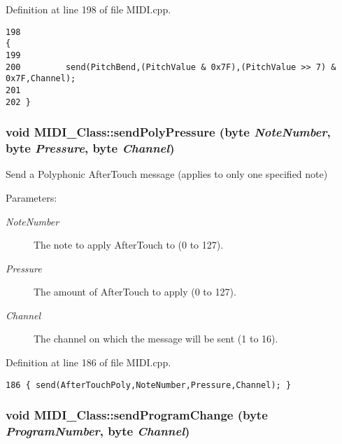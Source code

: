 Definition at line 198 of file MIDI.cpp.

\begin{Code}\begin{verbatim}198                                                                    {
199 
200         send(PitchBend,(PitchValue & 0x7F),(PitchValue >> 7) & 0x7F,Channel);
201         
202 }
\end{verbatim}
\end{Code}


\hypertarget{class_m_i_d_i___class_028ec5a49dccf9c28b00e11e7a3d1d05}{
\subsubsection[{sendPolyPressure}]{\setlength{\rightskip}{0pt plus 5cm}void MIDI\_\-Class::sendPolyPressure ({\bf byte} {\em NoteNumber}, \/  {\bf byte} {\em Pressure}, \/  {\bf byte} {\em Channel})}}
\label{class_m_i_d_i___class_028ec5a49dccf9c28b00e11e7a3d1d05}


Send a Polyphonic AfterTouch message (applies to only one specified note) \begin{Desc}
\item[Parameters:]
\begin{description}
\item[{\em NoteNumber}]The note to apply AfterTouch to (0 to 127). \item[{\em Pressure}]The amount of AfterTouch to apply (0 to 127). \item[{\em Channel}]The channel on which the message will be sent (1 to 16). \end{description}
\end{Desc}


Definition at line 186 of file MIDI.cpp.

\begin{Code}\begin{verbatim}186 { send(AfterTouchPoly,NoteNumber,Pressure,Channel); }
\end{verbatim}
\end{Code}


\hypertarget{class_m_i_d_i___class_803c2652837c09775d115354672bf69d}{
\subsubsection[{sendProgramChange}]{\setlength{\rightskip}{0pt plus 5cm}void MIDI\_\-Class::sendProgramChange ({\bf byte} {\em ProgramNumber}, \/  {\bf byte} {\em Channel})}}
\label{class_m_i_d_i___class_803c2652837c09775d115354672bf69d}


